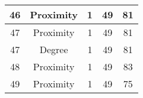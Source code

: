 \documentclass[results.tex]{subfiles}
\begin{document}
\begin{center}
\begin{tabular}{| c || c | c | c | c |}
            \hline
            46                      & Proximity                    & 1                      & 49                      & 81                   \\
            \hline
            47                      & Proximity                    & 1                      & 49                      & 81                   \\
            \hline
            47                      & Degree                       & 1                      & 49                      & 81                   \\
            \hline
            48                      & Proximity                    & 1                      & 49                      & 83                   \\
            \hline
            49                      & Proximity                    & 1                      & 49                      & 75                   \\
            \hline
        \end{tabular}
    \end{center}
\end{document}
